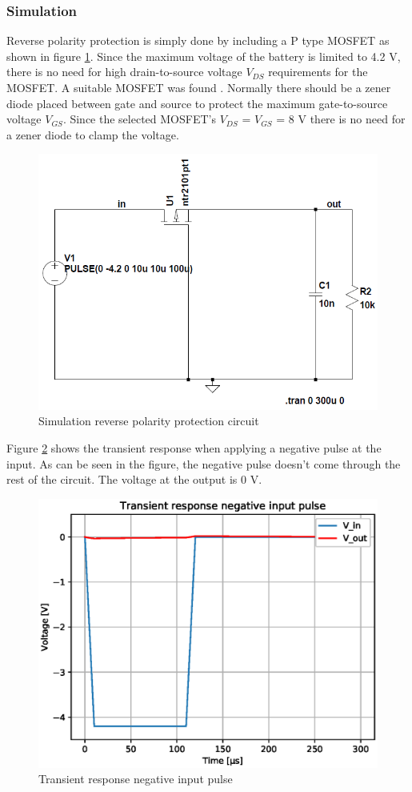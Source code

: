 \documentclass[11pt,a4paper]{article}
\begin{document}
\subsubsection{Simulation}\label{sec:reverse_pol_prot_sim}
Reverse polarity protection is simply done by including a P type MOSFET as shown in figure \ref{fig:reverse_polarity_protection_simulation}. Since the maximum voltage  of the battery is limited to 4.2 V, there is no need for high drain-to-source voltage $V_{DS}$ requirements for the MOSFET. A suitable MOSFET was found \cite{bib:NTR2101P}. Normally there should be a zener diode placed between gate and source to protect the maximum gate-to-source voltage $V_{GS}$. Since the selected MOSFET's $V_{DS}$ = $V_{GS}$ = 8 V there is no need for a zener diode to clamp the voltage. 
\begin{figure}[H]
	\centering
	\includegraphics[width=0.8\linewidth]{reverse_polarity_protection_simulation.png}
	\caption{Simulation reverse polarity protection circuit}
	\label{fig:reverse_polarity_protection_simulation}
\end{figure}
Figure \ref{fig:Transient_response_negative_input_pulse} shows the transient response when applying a negative pulse at the input. As can be seen in the figure, the negative pulse doesn't come through the rest of the circuit. The voltage at the output is 0 V.
\begin{figure}[H]
	\centering
	\includegraphics[width=0.8\linewidth]{Transient_response_negative_input_pulse.eps}
	\caption{Transient response negative input pulse}
	\label{fig:Transient_response_negative_input_pulse}
\end{figure}
\end{document}
